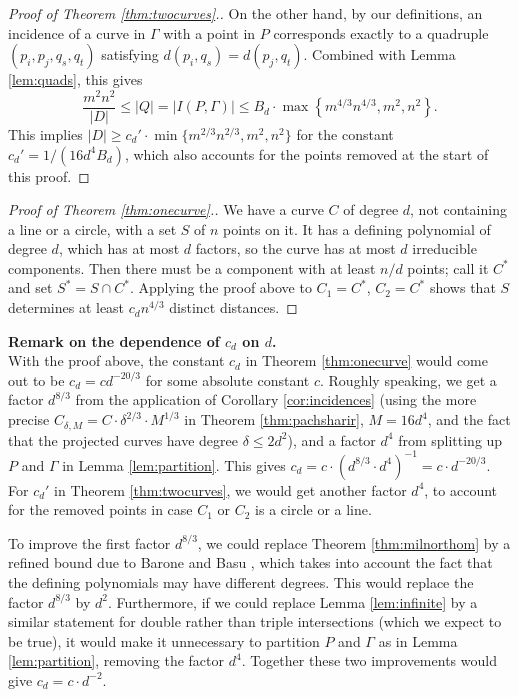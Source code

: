 \documentclass[12pt]{article}
\begin{document}
\begin{proof}[Proof of Theorem \ref{thm:twocurves}.]
 On the other hand, by our definitions, an incidence of a curve in $\Gamma$ with a point in $P$
 corresponds exactly to a quadruple $(p_i,p_j, q_s,q_t)$ satisfying $d(p_i, q_s) = d(p_j, q_t)$.
 Combined with Lemma \ref{lem:quads}, this gives
 $$\frac{m^2n^2}{|D|} \leq |Q| = |I(P,\Gamma)|\leq  B_d \cdot\max\left\{ m^{4/3}n^{4/3}, m^2, n^2\right\}.$$
 This implies $|D|\geq c_d' \cdot\min\{m^{2/3}n^{2/3}, m^2, n^2\}$ for the constant $c_d' = 1/(16d^4B_d)$, 
 which also accounts for the points removed at the start of this proof.
\end{proof}


\begin{proof}[Proof of Theorem \ref{thm:onecurve}.]
 We have a curve $C$ of degree $d$, not containing a line or a circle, with a set $S$ of $n$ points on it.
 It has a defining polynomial of degree $d$, which has at most $d$ factors, so the curve has at most $d$ irreducible components. 
 Then there must be a component with at least $n/d$ points; call it $C^*$ and set $S^* = S\cap C^*$.
 Applying the proof above to $C_1 = C^*$, $C_2 = C^*$ shows  
 that $S$ determines at least $c_d n^{4/3}$ distinct distances.
\end{proof}

 
\noindent \textbf{Remark on the dependence of $c_d$ on $d$.}\\
 With the proof above, the constant $c_d$ in Theorem \ref{thm:onecurve} would come out to be 
 $c_d = cd^{-20/3}$ for some absolute constant $c$.
 Roughly speaking, 
 we get a factor $d^{8/3}$ from the application of Corollary \ref{cor:incidences}
 (using the more precise $C_{\delta,M}=C\cdot \delta^{2/3}\cdot M^{1/3}$ in Theorem \ref{thm:pachsharir}, $M = 16d^4$, and the fact that the projected curves have degree $\delta \leq 2d^2$), 
 and a factor $d^4$ from splitting up $P$ and $\Gamma$ in Lemma \ref{lem:partition}.
 This gives $c_d = c\cdot (d^{8/3}\cdot d^4)^{-1} = c\cdot d^{-20/3}$. 
 For $c_d'$ in Theorem \ref{thm:twocurves}, 
 we would get another factor $d^4$, 
 to account for the removed points in case $C_1$ or $C_2$ is a circle or a line.
 
 To improve the first factor $d^{8/3}$, we could replace Theorem \ref{thm:milnorthom} by 
 a refined bound due to Barone and Basu \cite{barone:bezout}, 
 which takes into account the fact that the defining polynomials may have different degrees.
 This would replace the factor $d^{8/3}$ by $d^2$.
 Furthermore, if we could replace Lemma \ref{lem:infinite} by a similar statement
 for double rather than triple intersections (which we expect to be true), 
 it would make it unnecessary to partition $P$ and $\Gamma$ as in Lemma \ref{lem:partition}, 
 removing the factor $d^4$. 
 Together these two improvements would give $c_d = c\cdot d^{-2}$.
 
\end{document}
